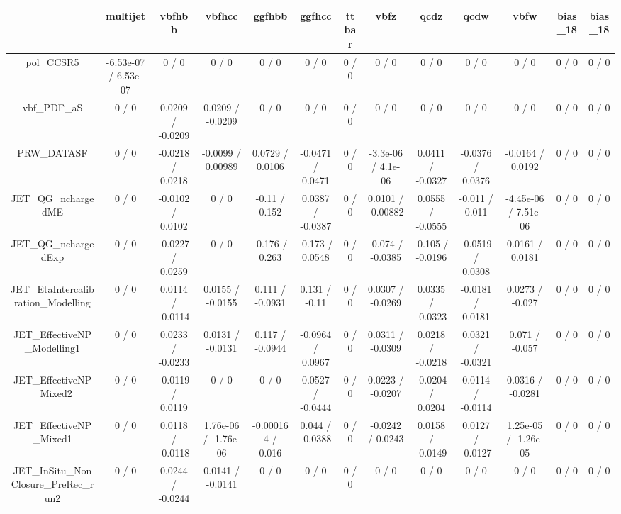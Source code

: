 \documentclass[10pt]{article}
\begin{document}
\begin{table}[htbp]
\begin{center}
\begin{tabular}{|c|c|c|c|c|c|c|c|c|c|c|c|c|}
\hline 
      & multijet      & vbfhbb      & vbfhcc      & ggfhbb      & ggfhcc      & ttbar      & vbfz      & qcdz      & qcdw      & vbfw      & bias_18      & bias_18 \\ 
\hline 
  pol_CCSR5 & -6.53e-07 / 6.53e-07 & 0 / 0 & 0 / 0 & 0 / 0 & 0 / 0 & 0 / 0 & 0 / 0 & 0 / 0 & 0 / 0 & 0 / 0 & 0 / 0 & 0 / 0 \\ 
  vbf_PDF_aS & 0 / 0 & 0.0209 / -0.0209 & 0.0209 / -0.0209 & 0 / 0 & 0 / 0 & 0 / 0 & 0 / 0 & 0 / 0 & 0 / 0 & 0 / 0 & 0 / 0 & 0 / 0 \\ 
  PRW_DATASF & 0 / 0 & -0.0218 / 0.0218 & -0.0099 / 0.00989 & 0.0729 / 0.0106 & -0.0471 / 0.0471 & 0 / 0 & -3.3e-06 / 4.1e-06 & 0.0411 / -0.0327 & -0.0376 / 0.0376 & -0.0164 / 0.0192 & 0 / 0 & 0 / 0 \\ 
  JET_QG_nchargedME & 0 / 0 & -0.0102 / 0.0102 & 0 / 0 & -0.11 / 0.152 & 0.0387 / -0.0387 & 0 / 0 & 0.0101 / -0.00882 & 0.0555 / -0.0555 & -0.011 / 0.011 & -4.45e-06 / 7.51e-06 & 0 / 0 & 0 / 0 \\ 
  JET_QG_nchargedExp & 0 / 0 & -0.0227 / 0.0259 & 0 / 0 & -0.176 / 0.263 & -0.173 / 0.0548 & 0 / 0 & -0.074 / -0.0385 & -0.105 / -0.0196 & -0.0519 / 0.0308 & 0.0161 / 0.0181 & 0 / 0 & 0 / 0 \\ 
  JET_EtaIntercalibration_Modelling & 0 / 0 & 0.0114 / -0.0114 & 0.0155 / -0.0155 & 0.111 / -0.0931 & 0.131 / -0.11 & 0 / 0 & 0.0307 / -0.0269 & 0.0335 / -0.0323 & -0.0181 / 0.0181 & 0.0273 / -0.027 & 0 / 0 & 0 / 0 \\ 
  JET_EffectiveNP_Modelling1 & 0 / 0 & 0.0233 / -0.0233 & 0.0131 / -0.0131 & 0.117 / -0.0944 & -0.0964 / 0.0967 & 0 / 0 & 0.0311 / -0.0309 & 0.0218 / -0.0218 & 0.0321 / -0.0321 & 0.071 / -0.057 & 0 / 0 & 0 / 0 \\ 
  JET_EffectiveNP_Mixed2 & 0 / 0 & -0.0119 / 0.0119 & 0 / 0 & 0 / 0 & 0.0527 / -0.0444 & 0 / 0 & 0.0223 / -0.0207 & -0.0204 / 0.0204 & 0.0114 / -0.0114 & 0.0316 / -0.0281 & 0 / 0 & 0 / 0 \\ 
  JET_EffectiveNP_Mixed1 & 0 / 0 & 0.0118 / -0.0118 & 1.76e-06 / -1.76e-06 & -0.000164 / 0.016 & 0.044 / -0.0388 & 0 / 0 & -0.0242 / 0.0243 & 0.0158 / -0.0149 & 0.0127 / -0.0127 & 1.25e-05 / -1.26e-05 & 0 / 0 & 0 / 0 \\ 
  JET_InSitu_NonClosure_PreRec_run2 & 0 / 0 & 0.0244 / -0.0244 & 0.0141 / -0.0141 & 0 / 0 & 0 / 0 & 0 / 0 & 0 / 0 & 0 / 0 & 0 / 0 & 0 / 0 & 0 / 0 & 0 / 0 \\ 

\end{tabular}
\end{center}
\end{table}
\end{document}

